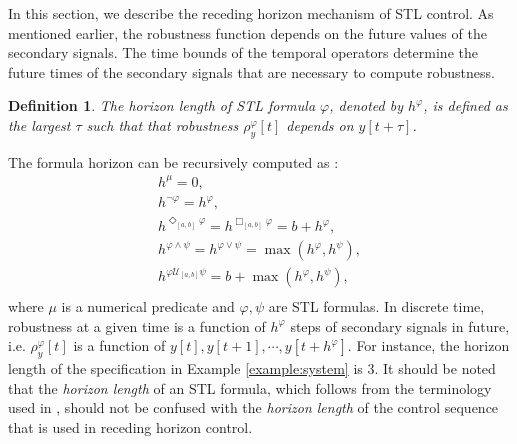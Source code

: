 \documentclass[letterpaper, 10 pt, conference]{ieeeconf}
\newtheorem{define}{Definition}
\begin{document}
In this section, we describe the receding horizon mechanism of STL control. 
As mentioned earlier, the robustness function depends on the future values of the secondary signals. The time bounds of the temporal operators determine the future times of the secondary signals that are necessary to compute robustness.
\begin{define}
The \emph{horizon} length of STL formula $\varphi$, denoted by $h^\varphi$, is defined as the largest $\tau$ such that that robustness $\rho_y^\varphi[t]$ depends on $y[t+\tau]$. 
 \end{define}
The formula horizon can be recursively computed as \cite{dokhanchi}:
\begin{equation}
\label{eq:horizon}
\begin{array}{l}
h^\mu=0, \\
h^{\neg \varphi}=h^\varphi, \\
h^{\Diamond_{[a,b]}\varphi}=h^{\Box_{[a,b]}\varphi}=b+h^{\varphi},\\
h^{\varphi \wedge \psi}=h^{\varphi \vee \psi}=\max(h^{\varphi},h^{\psi}), \\
h^{\varphi \mathcal{U}_{[a,b]} \psi}=b+\max(h^{\varphi},h^{\psi}), \\ 
\end{array}
\end{equation}
where $\mu$ is a numerical predicate and $\varphi,\psi$ are STL formulas. In discrete time, robustness at a given time is a function of $h^\varphi$ steps of secondary signals in future, i.e. $\rho_y^\varphi[t]$ is a function of $y[t],y[t+1],\cdots,y[t+h^\varphi]$. 
For instance, the horizon length of the specification in Example \ref{example:system} is 3. It should be noted that the \emph{horizon length} of an STL formula, which follows from the terminology used in \cite{dokhanchi}, should not be confused with the \emph{horizon length} of the control sequence that is used in receding horizon control. 
\end{document}
